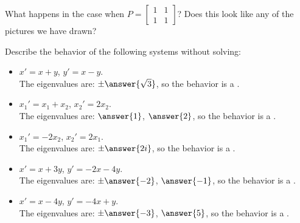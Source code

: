 \documentclass{ximera}
\begin{document}
\begin{exercise}
    What happens in the case when $P = \left[ \begin{smallmatrix} 1 & 1 \\ 1 & 1 \end{smallmatrix} \right]$? Does this look like any of the pictures we have drawn?
\end{exercise}

\begin{exercise}%
    Describe the behavior of the following systems without solving:
    \begin{itemize}
        \item $x' = x + y$, \quad $y' = x-y$.\\
        The eigenvalues are: $\pm \answer{\sqrt{3}}$, so the behavior is a .
        \item $x_1' = x_1 + x_2$, \quad $x_2' = 2 x_2$.\\
        The eigenvalues are: $\answer{1}$, $\answer{2}$, so the behavior is a .
        \item $x_1' = -2x_2$, \quad $x_2' = 2 x_1$.\\
        The eigenvalues are: $\pm \answer{2i}$, so the behavior is a .
        \item $x' = x + 3y$, \quad $y' = -2x-4y$.\\
        The eigenvalues are: $\pm \answer{-2}$, $\answer{-1}$, so the behavior is a .
        \item $x' = x - 4y$, \quad $y' = -4x+y$.\\
        The eigenvalues are: $\pm \answer{-3}$, $\answer{5}$, so the behavior is a .
    \end{itemize}
\end{exercise}
\end{document}
